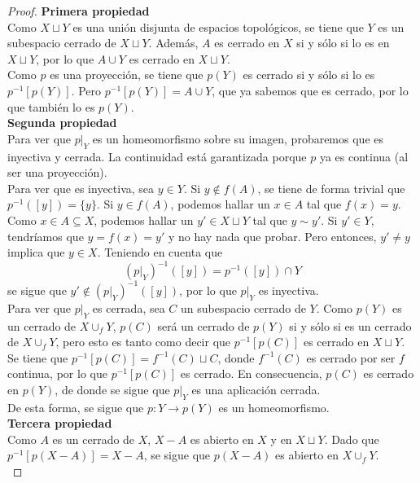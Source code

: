 \begin{proof}
\noindent\textbf{Primera propiedad}
\\
Como $X\sqcup Y$ es una unión disjunta de espacios topológicos, se tiene que $Y$ es un subespacio cerrado de $X\sqcup Y$. Además, $A$ es cerrado en $X$ si y sólo si lo es en $X \sqcup Y$, por lo que $A\cup Y$ es cerrado en $X \sqcup Y$.
\\

Como $p$ es una proyección, se tiene que $p(Y)$ es cerrado si y sólo si lo es $p^{-1}[p(Y)]$. Pero $p^{-1}[p(Y)]=A\cup Y$, que ya sabemos que es cerrado, por lo que también lo es $p(Y)$.
\\

\noindent\textbf{Segunda propiedad}
\\
Para ver que $p|_Y$ es un homeomorfismo sobre su imagen, probaremos que es inyectiva y cerrada. La continuidad está garantizada porque $p$ ya es continua (al ser una proyección).
\\

Para ver que es inyectiva, sea $y \in Y$. Si $y \not\in f(A)$, se tiene de forma trivial que $p^{-1}([y])=\{y\}$. Si $y \in f(A)$, podemos hallar un $x \in A$ tal que $f(x)=y$.
\\

Como $x \in A \subseteq X$, podemos hallar un $y' \in X\sqcup Y$ tal que $y \sim y'$. Si $y' \in Y$, tendríamos que $y=f(x)=y'$ y no hay nada que probar. Pero entonces, $y'\neq y$ implica que $y \in X$. Teniendo en cuenta que $$(p|_Y)^{-1}([y])=p^{-1}([y])\cap Y$$ se sigue que $y' \not \in (p|_Y)^{-1}([y])$, por lo que $p|_Y$ es inyectiva.
\\

Para ver que $p|_Y$ es cerrada, sea $C$ un subespacio cerrado de $Y$. Como $p(Y)$ es un cerrado de $X \cup_f Y$, $p(C)$ será un cerrado de $p(Y)$ si y sólo si es un cerrado de $X \cup_f Y$, pero esto es tanto como decir que $p^{-1}[p(C)]$ es cerrado en $X \sqcup Y$.
\\

Se tiene que $p^{-1}[p(C)]=f^{-1}(C)\sqcup C$, donde $f^{-1}(C)$ es cerrado por ser $f$ continua, por lo que $p^{-1}[p(C)]$ es cerrado. En consecuencia, $p(C)$ es cerrado en $p(Y)$, de donde se sigue que $p|_Y$ es una aplicación cerrada.
\\

De esta forma, se sigue que $p: Y \longrightarrow p(Y)$ es un homeomorfismo.
\\

\noindent\textbf{Tercera propiedad}
\\
Como $A$ es un cerrado de $X$, $X-A$ es abierto en $X$ y en $X \sqcup Y$. Dado que $p^{-1}[p(X-A)]=X-A$, se sigue que $p(X-A)$ es abierto en $X\cup_f Y$.
\\


\end{proof}
